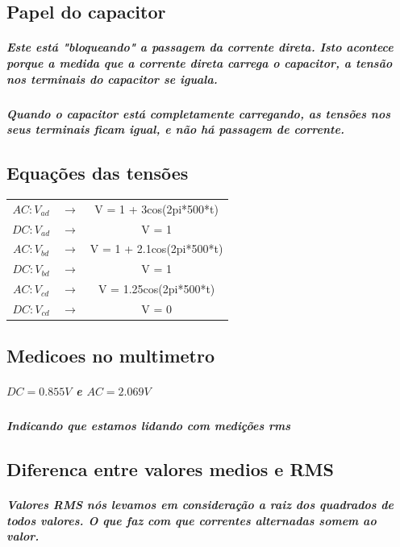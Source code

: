 \documentclass[12pt,twoside, a4paper, twocolumn]{article}
\begin{document}
\subsection{Papel do capacitor}

\subparagraph*{Este está "bloqueando" a passagem da corrente direta. Isto acontece porque a medida que a corrente direta carrega o capacitor, a tensão nos terminais do capacitor se iguala. }
\subparagraph*{Quando o capacitor está completamente carregando, as tensões nos seus terminais ficam igual, e não há passagem de corrente.}

\subsection{Equações das tensões}

\begin{center}
    \begin{tabular}{ |ccc| }
        \hline
        $AC: V_{ad}$ & $\rightarrow$ & V = 1 + 3cos(2pi*500*t)   \\
        $DC: V_{ad}$ & $\rightarrow$ & V = 1                     \\
        $AC: V_{bd}$ & $\rightarrow$ & V = 1 + 2.1cos(2pi*500*t) \\
        $DC: V_{bd}$ & $\rightarrow$ & V = 1                     \\
        $AC: V_{cd}$ & $\rightarrow$ & V = 1.25cos(2pi*500*t)    \\
        $DC: V_{cd}$ & $\rightarrow$ & V = 0                     \\
        \hline
    \end{tabular}
\end{center}




\subsection{Medicoes no multimetro}

\subparagraph*{$DC = 0.855V$ e $AC = 2.069V$}

\subparagraph*{Indicando que estamos lidando com medições rms}

\subsection{Diferenca entre valores medios e RMS}

\subparagraph*{Valores RMS nós levamos em consideração a raiz dos quadrados de todos valores. O que faz com que correntes alternadas somem ao valor. }
\end{document}
